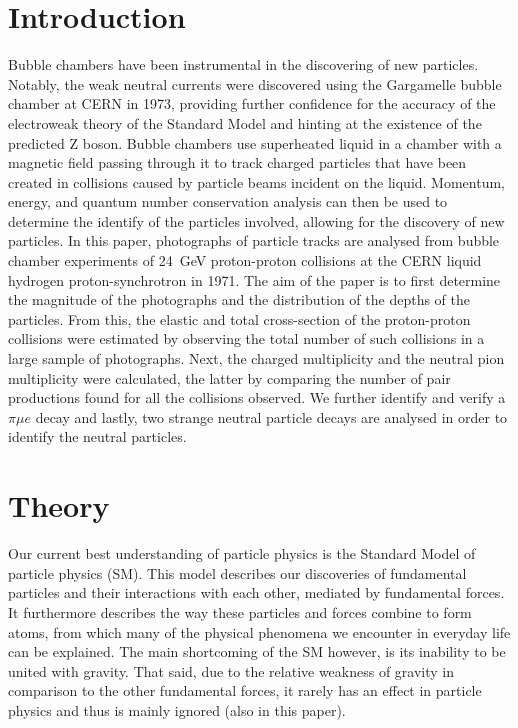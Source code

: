 \documentclass[twocolumn]{article}
\begin{document}
\section{Introduction}
Bubble chambers have been instrumental in the discovering of new particles. Notably, the weak neutral currents were discovered using the Gargamelle bubble chamber at CERN in 1973, providing further confidence for the accuracy of the electroweak theory of the Standard Model and hinting at the existence of the predicted Z boson. Bubble chambers use superheated liquid in a chamber with a magnetic field passing through it to track charged particles that have been created in collisions caused by particle beams incident on the liquid. Momentum, energy, and quantum number conservation analysis can then be used to determine the identify of the particles involved, allowing for the discovery of new particles. In this paper, photographs of particle tracks are analysed from bubble chamber experiments of 24~GeV proton-proton collisions at the CERN liquid hydrogen proton-synchrotron in 1971. The aim of the paper is to first determine the magnitude of the photographs and the distribution of the depths of the particles. From this, the elastic and total cross-section of the proton-proton collisions were estimated by observing the total number of such collisions in a large sample of photographs. Next, the charged multiplicity and the neutral pion multiplicity were calculated, the latter by comparing the number of pair productions found for all the collisions observed. We further identify and verify a $\pi\mu e$ decay and lastly, two strange neutral particle decays are analysed in order to identify the neutral particles.

\section{Theory}
Our current best understanding of particle physics is the Standard Model of particle physics (SM). This model describes our discoveries of fundamental particles and their interactions with each other, mediated by fundamental forces. It furthermore describes the way these particles and forces combine to form atoms, from which many of the physical phenomena we encounter in everyday life can be explained. The main shortcoming of the SM however, is its inability to be united with gravity. That said, due to the relative weakness of gravity in comparison to the other fundamental forces, it rarely has an effect in particle physics and thus is mainly ignored (also in this paper).
\end{document}
